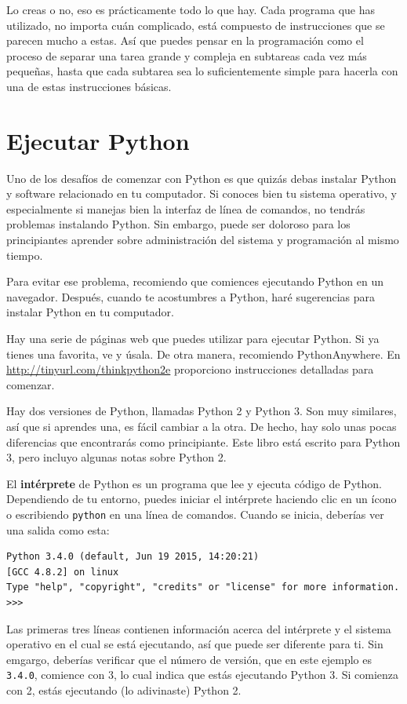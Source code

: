\documentclass[10pt]{book}
\begin{document}
Lo creas o no, eso es prácticamente todo lo que hay.  Cada
programa que has utilizado, no importa cuán complicado, está compuesto de
instrucciones que se parecen mucho a estas.  Así que puedes pensar en
la programación como el proceso de separar una tarea grande y compleja en
subtareas cada vez más pequeñas, hasta que cada subtarea sea lo suficientemente
simple para hacerla con una de estas instrucciones básicas.


\section{Ejecutar Python}

Uno de los desafíos de comenzar con Python es que quizás debas
instalar Python y software relacionado en tu computador.
Si conoces bien tu sistema operativo, y especialmente
si manejas bien la interfaz de línea de comandos, no tendrás
problemas instalando Python.  Sin embargo, puede ser doloroso para
los principiantes aprender sobre administración del sistema y programación al
mismo tiempo.

Para evitar ese problema, recomiendo que comiences ejecutando Python
en un navegador.  Después, cuando te acostumbres a Python, haré
sugerencias para instalar Python en tu computador.

Hay una serie de páginas web que puedes utilizar para ejecutar Python.  Si ya
tienes una favorita, ve y úsala.  De otra manera, recomiendo
PythonAnywhere.  En \url{http://tinyurl.com/thinkpython2e}
proporciono instrucciones detalladas para comenzar.

Hay dos versiones de Python, llamadas Python 2 y Python 3.
Son muy similares, así que si aprendes una, es fácil cambiar
a la otra.  De hecho, hay solo unas pocas diferencias que encontrarás
como principiante.
Este libro está escrito para Python 3, pero incluyo algunas notas
sobre Python 2.

El {\bf intérprete} de Python es un programa que lee y ejecuta
código de Python.  Dependiendo de tu entorno, puedes iniciar el intérprete
haciendo clic en un ícono o escribiendo {\tt python} en una
línea de comandos.
Cuando se inicia, deberías ver una salida como esta:

\begin{verbatim}
Python 3.4.0 (default, Jun 19 2015, 14:20:21)
[GCC 4.8.2] on linux
Type "help", "copyright", "credits" or "license" for more information.
>>>
\end{verbatim}
%
Las primeras tres líneas contienen información acerca del intérprete
y el sistema operativo en el cual se está ejecutando, así que puede ser
diferente para ti.  Sin emgargo, deberías verificar que el número de versión, que
en este ejemplo es {\tt 3.4.0}, comience con 3, lo cual indica que estás
ejecutando Python 3.  Si comienza con 2, estás ejecutando
(lo adivinaste) Python 2.
\end{document}
